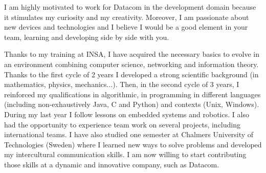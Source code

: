 \documentclass[11pt, a4paper]{awesome-cv}
\begin{document}
\begin{cvletter}
I am highly motivated to work for Datacom in the development domain because it stimulates my curiosity and my creativity. %
Moreover, I am passionate about new devices and technologies and I believe I would be a good element in your team, learning and developing side by side with you. 

\vspace{2mm} %

Thanks to my training at INSA, I have acquired the necessary basics to evolve in an environment combining computer science, networking and information theory. Thanks to the first cycle of 2 years I developed a strong scientific background (in mathematics, physics, mechanics...). Then, in the second cycle of 3 years, I reinforced my qualifications in algorithmic, in programming in different languages (including non-exhaustively Java, C and Python) and contexts (Unix, Windows). During my last year I follow lessons on embedded systems and robotics. I also had the opportunity to experience team work on several projects, including international teams. I have also studied one semester at Chalmers University of Technologies (Sweden) where I learned new ways to solve problems and developed my intercultural communication skills. \newline 
I am now willing to start contributing those skills at a dynamic and innovative company, such as Datacom.%



\end{cvletter}
\end{document}
